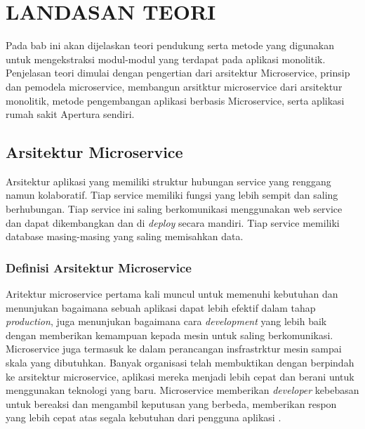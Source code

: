 \chapter{LANDASAN TEORI}
Pada bab ini akan dijelaskan teori pendukung serta metode yang digunakan untuk mengekstraksi modul-modul yang terdapat pada aplikasi monolitik. Penjelasan teori dimulai dengan pengertian dari arsitektur Microservice, prinsip dan pemodela microservice, membangun arsitktur microservice dari arsitektur monolitik, metode pengembangan aplikasi berbasis Microservice, serta aplikasi rumah sakit Apertura sendiri.

%
\vspace{4.5pt}

\section{Arsitektur Microservice}
Arsitektur aplikasi yang memiliki struktur hubungan service yang renggang namun kolaboratif. Tiap service memiliki fungsi yang lebih sempit dan saling berhubungan. Tiap service ini saling berkomunikasi menggunakan web service dan dapat dikembangkan dan di \textit{deploy} secara mandiri. Tiap service memiliki database masing-masing yang saling memisahkan data. 
\subsection{Definisi Arsitektur Microservice}
Aritektur microservice pertama kali muncul untuk memenuhi kebutuhan dan menunjukan bagaimana sebuah aplikasi dapat lebih efektif dalam tahap \textit{production}, juga menunjukan bagaimana cara \textit{development} yang lebih baik dengan memberikan kemampuan kepada mesin untuk saling berkomunikasi. Microservice juga termasuk ke dalam perancangan insfrastrktur mesin sampai skala yang dibutuhkan. Banyak organisasi telah membuktikan dengan berpindah ke arsitektur microservice, aplikasi mereka menjadi lebih cepat dan berani untuk menggunakan teknologi yang baru. Microservice memberikan \textit{developer} kebebasan untuk bereaksi dan mengambil keputusan yang berbeda, memberikan respon yang lebih cepat atas segala kebutuhan dari pengguna aplikasi \cite{9}.
